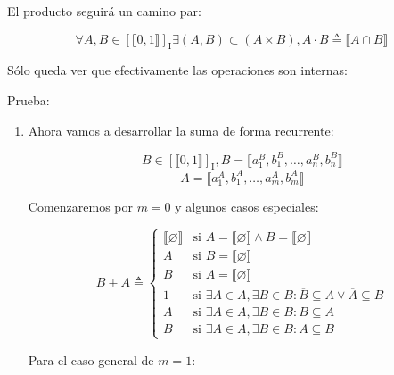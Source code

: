 El producto seguirá un camino par:

\[ \forall A, B \in \left\lbrack \llbracket 0,1 \rrbracket \right\rbrack_{\mathbf{\mathrm{I}}} \exists (A,B) \subset (A \times B), A \cdot B \triangleq \llbracket A \cap B \rrbracket \]

Sólo queda ver que efectivamente las operaciones son internas:

Prueba:

\begin{enumerate}
\item Ahora vamos a desarrollar la suma de forma recurrente:

\[ B \in \left\lbrack \llbracket 0,1 \rrbracket \right\rbrack_{\mathbf{\mathrm{I}}}, B = \llbracket a_{1}^{B},b_{1}^{B},\ldots,a_{n}^{B},b_{n}^{B} \rrbracket \]
\[ A = \llbracket a_{1}^{A},b_{1}^{A},\ldots,a_{m}^{A},b_{m}^{A} \rrbracket \]

Comenzaremos por $m = 0$ y algunos casos especiales:

\[
B + A \triangleq \begin{cases}
  \llbracket \varnothing \rrbracket & \text{si } A = \llbracket \varnothing \rrbracket \land B = \llbracket \varnothing \rrbracket \\
  A & \text{si } B = \llbracket \varnothing \rrbracket \\
  B & \text{si } A = \llbracket \varnothing \rrbracket \\
  1 & \text{si } \exists A \in A, \exists B \in B : \overline{B} \subseteq A \lor \overline{A} \subseteq B \\
  A & \text{si } \exists A \in A, \exists B \in B : B \subseteq A \\
  B & \text{si } \exists A \in A, \exists B \in B : A \subseteq B
\end{cases}
\]

Para el caso general de $m = 1:$


\end{enumerate}
